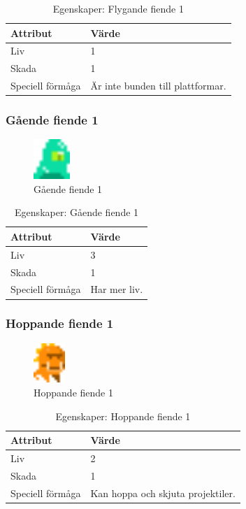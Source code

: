 \documentclass{TDP005mall}
\begin{document}
\begin{table}[h!]
  \caption{Egenskaper: Flygande fiende 1\label{tab:3}}
\begin{tabular}{|l|l|}
\hline
Attribut & Värde \\\hline
Liv & 1 \\\hline
Skada & 1 \\\hline
Speciell förmåga & Är inte bunden till plattformar. \\\hline
\end{tabular}
\end{table}

\newpage

\subsubsection*{Gående fiende 1}
\begin{figure}[h!]
  \caption{Gående fiende 1\label{fig:2}}
  \centerline{\includegraphics[height=1.5cm, left]{images/sslime_ememy.png}}
\end{figure}

\begin{table}[h!]
  \caption{Egenskaper: Gående fiende 1\label{tab:4}}
\begin{tabular}{|l|l|}
\hline
Attribut & Värde \\\hline
Liv & 3 \\\hline
Skada & 1 \\\hline
Speciell förmåga & Har mer liv. \\\hline
\end{tabular}
\end{table}


\subsubsection*{Hoppande fiende 1}
\begin{figure}[h!]
  \includegraphics[height=1.5cm]{images/sjumping_enemy1.png}
  \caption{Hoppande fiende 1\label{fig:3}}
\end{figure}

\begin{table}[h!]
  \caption{Egenskaper: Hoppande fiende 1\label{tab:5}}
\begin{tabular}{|l|l|}
\hline
Attribut & Värde \\\hline
Liv & 2 \\\hline
Skada & 1 \\\hline
Speciell förmåga & Kan hoppa och skjuta projektiler. \\\hline
\end{tabular}
\end{table}
\end{document}
